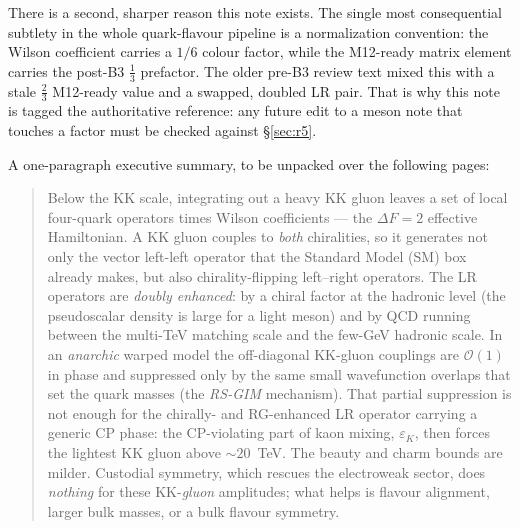\documentclass[11pt]{article}
\newcommand{\eps}{\varepsilon}
\theoremstyle{definition}
\begin{document}
There is a second, sharper reason this note exists. The single most consequential
subtlety in the whole quark-flavour pipeline is a normalization convention: the
Wilson coefficient carries a $1/6$ colour factor, while the M12-ready matrix
element carries the post-B3 $\tfrac13$ prefactor. The older pre-B3 review text
mixed this with a stale $\tfrac23$ M12-ready value and a swapped, doubled LR pair.
That is why this note is tagged the authoritative reference: any future edit to a
meson note that touches a factor must be checked against \S\ref{sec:r5}.

A one-paragraph executive summary, to be unpacked over the following pages:

\begin{quote}
\small
Below the KK scale, integrating out a heavy KK gluon leaves a set of local
four-quark operators times Wilson coefficients --- the $\Delta F=2$ effective
Hamiltonian. A KK gluon couples to \emph{both} chiralities, so it generates not
only the vector left-left operator that the Standard Model (SM) box already makes,
but also chirality-flipping left--right operators. The LR operators are
\emph{doubly enhanced}: by a chiral factor at the hadronic level (the
pseudoscalar density is large for a light meson) and by QCD running between the
multi-TeV matching scale and the few-GeV hadronic scale. In an \emph{anarchic}
warped model the off-diagonal KK-gluon couplings are $\mathcal{O}(1)$ in phase
and suppressed only by the same small wavefunction overlaps that set the quark
masses (the \emph{RS-GIM} mechanism). That partial suppression is not enough for
the chirally- and RG-enhanced LR operator carrying a generic CP phase: the
CP-violating part of kaon mixing, $\eps_K$, then forces the lightest KK gluon
above $\sim20$~TeV. The beauty and charm bounds are milder. Custodial symmetry,
which rescues the electroweak sector, does \emph{nothing} for these
KK-\emph{gluon} amplitudes; what helps is flavour alignment, larger bulk masses,
or a bulk flavour symmetry.
\end{quote}
\end{document}
